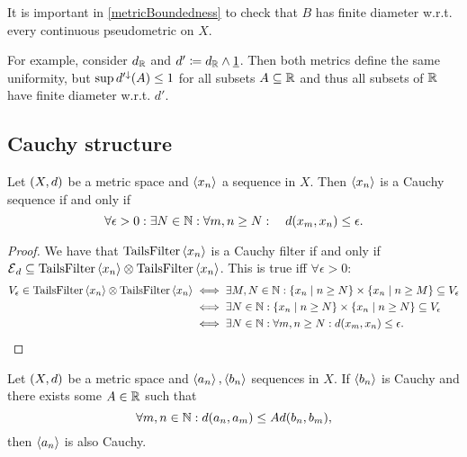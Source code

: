 \begin{example}
It is important in \ref{metricBoundedness} to check that $B$ has finite diameter w.r.t. every continuous pseudometric on $X$.

For example, consider $d_{\mathbb{R}}$ and $d' \coloneqq d_{\mathbb{R}} \wedge \underline{1}$. Then both metrics define the same uniformity, but $\sup d^{\prime\downarrow}(A) \leq 1$ for all subsets $A\subseteq \mathbb{R}$ and thus all subsets of $\mathbb{R}$ have finite diameter w.r.t. $d'$. 
\end{example}

\subsection{Cauchy structure}

\begin{lemma} \label{metricCauchySequence}
Let $\sSet{X,d}$ be a metric space and $\left\langle x_n \right\rangle$ a sequence in $X$. Then $\left\langle x_n \right\rangle$ is a Cauchy sequence \textup{if and only if}
\[ \forall \epsilon >0: \exists N\in\mathbb{N}: \forall m,n \geq N: \quad d(x_m, x_n)\leq \epsilon. \]
\end{lemma}
\begin{proof}
We have that $\operatorname{TailsFilter}\left\langle x_n \right\rangle$ is a Cauchy filter \textup{if and only if} $\operatorname{\mathcal{E}}_d \subseteq \operatorname{TailsFilter}\left\langle x_n \right\rangle\otimes \operatorname{TailsFilter}\left\langle x_n \right\rangle$. This is true iff $\forall \epsilon>0$:
\begin{align*}
V_\epsilon \in \TailsFilter\seq{x_n}\otimes \TailsFilter\seq{x_n} &\iff \exists M,N\in\N: \setbuilder{x_n}{n\geq N}\times\setbuilder{x_n}{n\geq M} \subseteq V_\epsilon \\
&\iff \exists N\in\N: \setbuilder{x_n}{n\geq N}\times\setbuilder{x_n}{n\geq N} \subseteq V_\epsilon \\
&\iff \exists N\in\N: \forall m,n \geq N: d(x_m, x_n)\leq \epsilon.
\end{align*}
\end{proof}

\begin{lemma} \label{CauchyCriterion}
Let $\sSet{X,d}$ be a metric space and $\left\langle a_n \right\rangle, \left\langle b_n \right\rangle$ sequences in $X$. If $\left\langle b_n \right\rangle$ is Cauchy and there exists some $A\in\mathbb{R}$ such that
\[ \forall m,n\in\mathbb{N}: d(a_n,a_m) \leq A d(b_n,b_m), \]
then $\left\langle a_n \right\rangle$ is also Cauchy.
\end{lemma}

